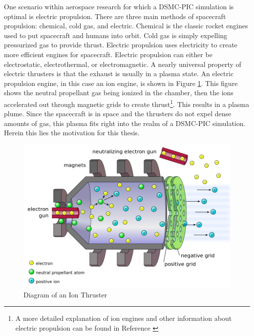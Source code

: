 \indent One scenario within aerospace research for which a DSMC-PIC simulation is optimal is electric propulsion. There are three main methods of spacecraft propulsion: chemical, cold gas, and electric. Chemical is the classic rocket engines used to put spacecraft and humans into orbit. Cold gas is simply expelling pressurized gas to provide thrust. Electric propulsion uses electricity to create more efficient engines for spacecraft. Electric propulsion can either be electrostatic, electrothermal, or electromagnetic. A nearly universal property of electric thrusters is that the exhaust is usually in a plasma state. An electric propulsion engine, in this case an ion engine, is shown in Figure \ref{fig:ion_thruster}. This figure shows the neutral propellant gas being ionized in the chamber, then the ions accelerated out through magnetic grids to create thrust\footnote{A more detailed explanation of ion engines and other information about electric propulsion can be found in Reference \cite{gobel}}. This results in a plasma plume. Since the spacecraft is in space and the thrusters do not expel dense amounts of gas, this plasma fits right into the realm of a DSMC-PIC simulation. Herein this lies the motivation for this thesis. \par


\begin{figure}
    \includegraphics[width=.85\textwidth]{figures/ion_thruster.png}
    \centering
    \caption[Diagram of an Ion Thruster]{Diagram of an Ion Thruster \textmd{\cite{ion_thruster} }}
    \label{fig:ion_thruster}
\end{figure}


